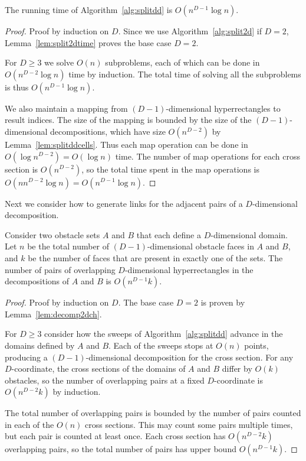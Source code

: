 \documentclass[english,gradu]{tktltiki2018}
\begin{document}
\begin{lem}\label{lem:splitddtime}The running time of Algorithm~\ref{alg:splitdd} is $O(n^{D-1}\log n)$.\end{lem}
\begin{proof}
Proof by induction on $D$.
Since we use Algorithm~\ref{alg:split2d} if $D=2$, Lemma~\ref{lem:split2dtime} proves the base case $D=2$.

For $D\ge 3$ we solve $O(n)$ subproblems, each of which can be done in $O(n^{D-2}\log n)$ time by induction.
The total time of solving all the subproblems is thus $O(n^{D-1}\log n)$.

We also maintain a mapping from $(D-1)$-dimensional hyperrectangles to result indices.
The size of the mapping is bounded by the size of the $(D-1)$-dimensional decompositions, which have size $O(n^{D-2})$ by Lemma~\ref{lem:splitddcells}.
Thus each map operation can be done in $O(\log{n^{D-2}})=O(\log n)$ time.
The number of map operations for each cross section is $O(n^{D-2})$, so the total time spent in the map operations is $O(nn^{D-2}\log n)=O(n^{D-1}\log n)$.
\end{proof}

Next we consider how to generate links for the adjacent pairs of a $D$-dimensional decomposition.

\begin{lem}\label{lem:decompddch}
Consider two obstacle sets $A$ and $B$ that each define a $D$-dimensional domain.
Let $n$ be the total number of $(D-1)$-dimensional obstacle faces in $A$ and $B$, and $k$ be the number of faces that are present in exactly one of the sets.
The number of pairs of overlapping $D$-dimensional hyperrectangles in the decompositions of $A$ and $B$ is $O(n^{D-1}k)$.
\end{lem}
\begin{proof}
Proof by induction on $D$.
The base case $D=2$ is proven by Lemma~\ref{lem:decomp2dch}.

For $D\ge 3$ consider how the sweeps of Algorithm~\ref{alg:splitdd} advance in the domains defined by $A$ and $B$.
Each of the sweeps stops at $O(n)$ points, producing a $(D-1)$-dimensional decomposition for the cross section.
For any $D$-coordinate, the cross sections of the domains of $A$ and $B$ differ by $O(k)$ obstacles, so the number of overlapping pairs at a fixed $D$-coordinate is $O(n^{D-2}k)$ by induction.

The total number of overlapping pairs is bounded by the number of pairs counted in each of the $O(n)$ cross sections.
This may count some pairs multiple times, but each pair is counted at least once.
Each cross section has $O(n^{D-2}k)$ overlapping pairs, so the total number of pairs has upper bound $O(n^{D-1}k)$.
\end{proof}
\end{document}
